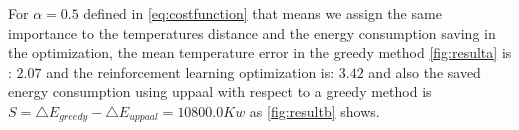       For $\alpha = 0.5$ defined in \autoref{eq:costfunction} that means we assign the same 
      importance to the temperatures distance and the energy consumption saving in the 
      optimization, the mean temperature error in the greedy method 
      \autoref{fig:resulta} is : $2.07$ and the reinforcement learning optimization 
      is:  $3.42$ and also the saved energy consumption using uppaal with respect to 
      a greedy method is $ S = \bigtriangleup E_{greedy} - \bigtriangleup E_{uppaal} = 10800.0Kw$
       as \autoref{fig:resultb} shows. %
        
